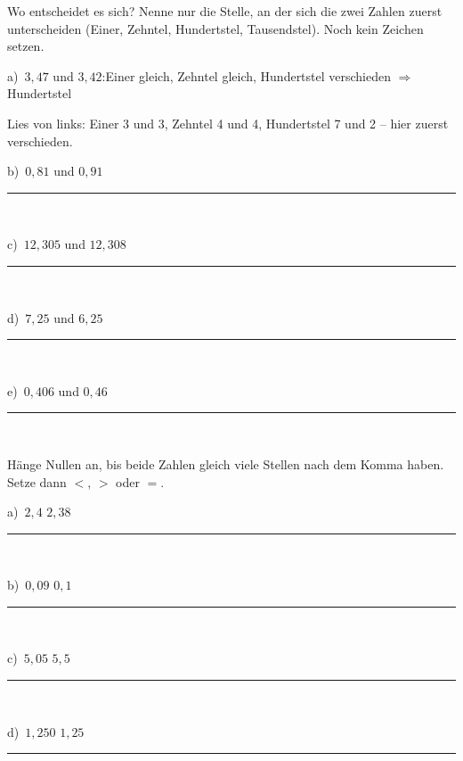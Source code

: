 \documentclass[11pt]{article}
\providecommand{\linie}[1]{\,{\color{black!45}\rule[-1pt]{#1}{0.4pt}}\,}
\providecommand{\grau}[1]{{\color{mbgrau}#1}}
\newcommand{\aufg}[3]{\par\noindent\makebox[0pt][r]{#3}\begin{minipage}[t]{\linewidth}#1\end{minipage}\par}
\newcommand{\nr}[1]{\makebox[7mm][l]{\textbf{#1}}}
\begin{document}
\aufg{\nr{1.}\begin{minipage}[t]{\dimexpr\linewidth-7mm\relax}Wo entscheidet es sich? Nenne nur die Stelle, an der sich die zwei Zahlen zuerst unterscheiden (Einer, Zehntel, Hundertstel, Tausendstel). Noch kein Zeichen setzen.\par\smallskip
\grau{a)\ $3{,}47$ und $3{,}42$:\quad Einer gleich, Zehntel gleich, Hundertstel verschieden $\Rightarrow$ Hundertstel}\par{\small Lies von links: Einer 3 und 3, Zehntel 4 und 4, Hundertstel 7 und 2 – hier zuerst verschieden.}\par\medskip
\noindent\begin{minipage}[t]{0.48\linewidth}\raggedright
b)\ $0{,}81$ und $0{,}91$\linie{25mm}
\end{minipage}\hfill
\begin{minipage}[t]{0.48\linewidth}\raggedright
c)\ $12{,}305$ und $12{,}308$\linie{25mm}
\end{minipage}\par\smallskip
\noindent\begin{minipage}[t]{0.48\linewidth}\raggedright
d)\ $7{,}25$ und $6{,}25$\linie{25mm}
\end{minipage}\hfill
\begin{minipage}[t]{0.48\linewidth}\raggedright
e)\ $0{,}406$ und $0{,}46$\linie{25mm}
\end{minipage}\par\smallskip\end{minipage}}{}{}
\medskip
\aufg{\nr{2.}\begin{minipage}[t]{\dimexpr\linewidth-7mm\relax}Hänge Nullen an, bis beide Zahlen gleich viele Stellen nach dem Komma haben. Setze dann $<$, $>$ oder $=$.\par\smallskip
\noindent\begin{minipage}[t]{0.48\linewidth}\raggedright
a)\ $2{,}4$ \fbox{\phantom{$<$}} $2{,}38$\linie{25mm}
\end{minipage}\hfill
\begin{minipage}[t]{0.48\linewidth}\raggedright
b)\ $0{,}09$ \fbox{\phantom{$<$}} $0{,}1$\linie{25mm}
\end{minipage}\par\smallskip
\noindent\begin{minipage}[t]{0.48\linewidth}\raggedright
c)\ $5{,}05$ \fbox{\phantom{$<$}} $5{,}5$\linie{25mm}
\end{minipage}\hfill
\begin{minipage}[t]{0.48\linewidth}\raggedright
d)\ $1{,}250$ \fbox{\phantom{$<$}} $1{,}25$\linie{25mm}
\end{minipage}\par\smallskip\end{minipage}}{}{}
\end{document}
